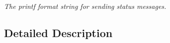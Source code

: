 \begin{DoxyCompactItemize}
\begin{DoxyCompactList}\small\item\em The printf format string for sending status messages. \end{DoxyCompactList}\end{DoxyCompactItemize}


\subsection{Detailed Description}
